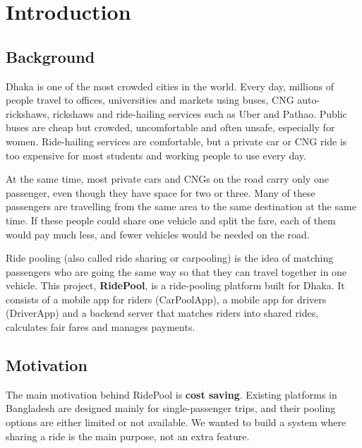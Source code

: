 \chapter{Introduction}
\label{ch:introduction}

\section{Background}
\label{sec:background}

Dhaka is one of the most crowded cities in the world. Every day, millions of
people travel to offices, universities and markets using buses, CNG
auto-rickshaws, rickshaws and ride-hailing services such as Uber and Pathao.
Public buses are cheap but crowded, uncomfortable and often unsafe, especially
for women. Ride-hailing services are comfortable, but a private car or CNG ride
is too expensive for most students and working people to use every day.

At the same time, most private cars and CNGs on the road carry only one
passenger, even though they have space for two or three. Many of these
passengers are travelling from the same area to the same destination at the
same time. If these people could share one vehicle and split the fare, each of
them would pay much less, and fewer vehicles would be needed on the road.

Ride pooling (also called ride sharing or carpooling) is the idea of matching
passengers who are going the same way so that they can travel together in one
vehicle. This project, \textbf{RidePool}, is a ride-pooling platform built for
Dhaka. It consists of a mobile app for riders (CarPoolApp), a mobile app for
drivers (DriverApp) and a backend server that matches riders into shared rides,
calculates fair fares and manages payments.

\section{Motivation}
\label{sec:motivation}

The main motivation behind RidePool is \textbf{cost saving}. Existing platforms
in Bangladesh are designed mainly for single-passenger trips, and their pooling
options are either limited or not available. We wanted to build a system where
sharing a ride is the main purpose, not an extra feature.

